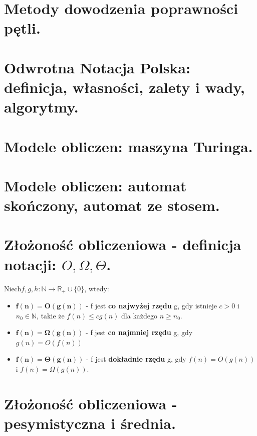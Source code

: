 \documentclass[12pt]{article}
\begin{document}
    \section{Metody dowodzenia poprawności pętli.}
    \section{Odwrotna Notacja Polska: definicja, własności, zalety i wady, algorytmy.}
    \section{Modele obliczen: maszyna Turinga.}
    \section{Modele obliczen: automat skończony, automat ze stosem.}

    \newpage

    \section{Złożoność obliczeniowa - definicja notacji: $O, \Omega, \Theta$.}
    \begin{definition}
        Niech$f, g, h: \mathbb{N} \rightarrow \mathbb{R}_{+} \cup \{0\}$, wtedy:
        \begin{itemize}
            \item $\mathbf{f(n) = O(g(n))}$ - f jest \textbf{co najwyżej rzędu} g, gdy istnieje $c > 0$ i
            $n_0 \in \mathbb{N}$, takie że $f(n)  \leq cg(n)$ dla każdego $n \geq n_0$.
            \item $\mathbf{f(n) = \Omega(g(n))}$ - f jest \textbf{co najmniej rzędu} g, gdy $g(n) = O(f(n))$
            \item $\mathbf{f(n) = \Theta(g(n))}$ - f jest \textbf{dokładnie rzędu} g, gdy $f(n) = O(g(n))$
            i $f(n) = \Omega(g(n))$.
        \end{itemize}
    \end{definition}

    \newpage

    \section{Złożoność obliczeniowa - pesymistyczna i średnia.}
\end{document}
